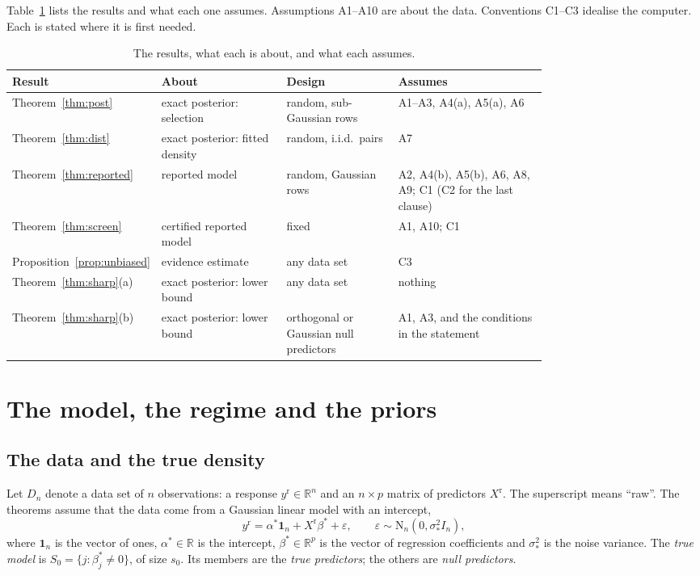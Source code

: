 \documentclass[11pt]{article}
\newcommand{\R}{\mathbb{R}}
\newcommand{\one}{\mathbf{1}}
\newcommand{\N}{\mathrm{N}}
\newcommand{\yr}{y^{\mathrm r}}
\newcommand{\Xr}{X^{\mathrm r}}
\newcommand{\bstar}{\beta^*}
\newcommand{\sigs}{\sigma_*}
\newcommand{\Sz}{S_0}
\newcommand{\sz}{s_0}
\newcommand{\Dn}{D_n}
\theoremstyle{plain}
\theoremstyle{definition}
\begin{document}
Table~\ref{tab:guide} lists the results and what each one assumes. Assumptions A1--A10 are about the data. Conventions
C1--C3 idealise the computer. Each is stated where it is first needed.

\begin{table}[ht]
\centering\small
\caption{The results, what each is about, and what each assumes.}\label{tab:guide}
\setlength{\tabcolsep}{4pt}
\begin{tabular}{@{}l>{\raggedright\arraybackslash}p{0.25\linewidth}>{\raggedright\arraybackslash}p{0.22\linewidth}>{\raggedright\arraybackslash}p{0.30\linewidth}@{}}
\toprule
Result & About & Design & Assumes \\
\midrule
Theorem~\ref{thm:post} & exact posterior: selection & random, sub-Gaussian rows & A1--A3, A4(a), A5(a), A6 \\
Theorem~\ref{thm:dist} & exact posterior: fitted density & random, i.i.d.\ pairs & A7 \\
Theorem~\ref{thm:reported} & reported model & random, Gaussian rows & A2, A4(b), A5(b), A6, A8, A9; C1 (C2 for the last clause) \\
Theorem~\ref{thm:screen} & certified reported model & fixed & A1, A10; C1 \\
Proposition~\ref{prop:unbiased} & evidence estimate & any data set & C3 \\
Theorem~\ref{thm:sharp}(a) & exact posterior: lower bound & any data set & nothing \\
Theorem~\ref{thm:sharp}(b) & exact posterior: lower bound & orthogonal or Gaussian null predictors & A1, A3, and the conditions in the statement \\
\bottomrule
\end{tabular}
\end{table}

\section{The model, the regime and the priors}\label{sec:model}

\subsection{The data and the true density}\label{sec:truth}

Let $\Dn$ denote a data set of $n$ observations: a response $\yr\in\R^n$ and an $n\times p$ matrix of predictors
$\Xr$. The superscript means ``raw''. The theorems assume that the data come from a Gaussian linear model with an
intercept,
\begin{equation}\label{eq:model}
  \yr=\alpha^*\one_n+\Xr\bstar+\varepsilon,\qquad \varepsilon\sim\N_n(0,\sigs^2I_n),
\end{equation}
where $\one_n$ is the vector of ones, $\alpha^*\in\R$ is the intercept, $\bstar\in\R^p$ is the vector of regression
coefficients and $\sigs^2$ is the noise variance. The \emph{true model} is $\Sz=\{j:\beta^*_j\neq0\}$, of size $\sz$. Its
members are the \emph{true predictors}; the others are \emph{null predictors}.
\end{document}
